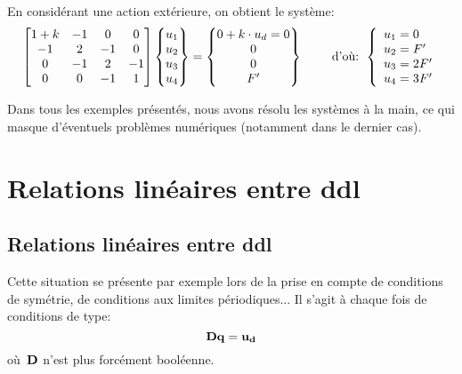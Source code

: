 \medskipvm
En considérant une action extérieure, on obtient le système:
\begin{equation}
\MM*{1+k & -1 & 0 & 0 \\ -1 & 2 & -1 & 0 \\ 0 & -1 & 2 & -1\\ 0&0&-1&1}
\VV*{u_1\\u_2\\u_3\\u_4}
=
\VV*{0+k\cdot u_d = 0\\0\\0\\F'}
\qquad \text{ d'où: } 
\left\{\begin{array}{l} u_1=0 \\ u_2=F' \\ u_3=2F' \\ u_4=3F' \end{array}\right.
\end{equation}


\medskip
Dans tous les exemples présentés, nous avons résolu les systèmes à la main, ce qui masque d'éventuels
problèmes numériques (notamment dans le dernier cas).

\medskip
\ifVersionAvecExemplesSepares
  \section{Relations linéaires entre ddl}
\else
  \subsection{Relations linéaires entre ddl}
\fi
Cette situation se présente par exemple lors de la prise en compte de conditions de symétrie, de conditions aux limites périodiques... Il s'agit à chaque fois de conditions de type:
\begin{equation}
\MM{D}\VV{q} = \VV{u_d}
\end{equation}
où~$\MM{D}$ n'est plus forcément booléenne.

